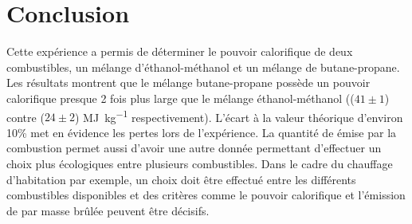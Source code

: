 \section{Conclusion}

Cette expérience a permis de déterminer le pouvoir calorifique de deux combustibles, un mélange d'éthanol-méthanol et un mélange de butane-propane. Les résultats montrent que le mélange butane-propane possède un pouvoir calorifique presque 2 fois plus large que le mélange éthanol-méthanol ((\(41 \pm 1\)) contre (\(24 \pm 2\)) \si{\mega\joule\per\kilo\gram} respectivement). L'écart à la valeur théorique d'environ 10\% met en évidence les pertes lors de l'expérience. La quantité de  émise par la combustion permet aussi d'avoir une autre donnée permettant d'effectuer un choix plus écologiques entre plusieurs combustibles. Dans le cadre du chauffage d'habitation par exemple, un choix doit être effectué entre les différents combustibles disponibles et des critères comme le pouvoir calorifique et l'émission de  par masse brûlée peuvent être décisifs.